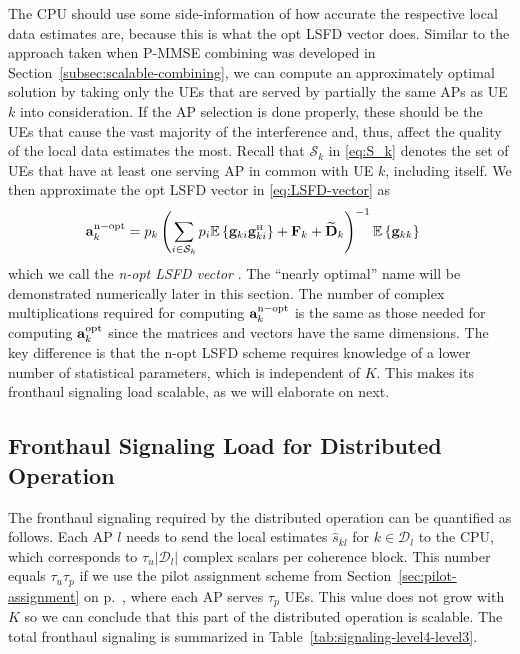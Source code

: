 The CPU should use some side-information of how accurate the respective local data estimates are, because this is what the opt LSFD vector does. Similar to the approach taken when P-MMSE combining was developed in Section~\ref{subsec:scalable-combining}, we can compute an approximately optimal solution by taking only the UEs that are served by partially the same APs as UE $k$ into consideration. If the AP selection is done properly, these should be the UEs that cause the vast majority of the interference and, thus, affect the quality of the local data estimates the most. Recall that $\mathcal{S}_k$ in \eqref{eq:S_k} denotes the set of UEs that have at least one serving AP in common with UE $k$, including itself. We then approximate the opt LSFD vector in \eqref{eq:LSFD-vector} as
\begin{align} \label{eq:partial-LSFD-vector}
&{\vect{a}}_{k}^{\rm n-opt} = p_k  \left( \sum\limits_{i\in \mathcal{S}_k}
p_{i} \mathbb{E} \left\{ {\vect{g}}_{ki} {\vect{g}}_{ki}^{\Htran} \right\} +   {\vect{F}}_{k} + \widetilde{\vect{D}}_k  \right)^{-1} \mathbb{E}\left\{ {\vect{g}}_{kk}\right\}
\end{align}
which we call the \emph{\gls{n-opt} LSFD vector} \cite{globecom_nopt}. The ``nearly optimal''  name will be demonstrated numerically later in this section.
The number of complex multiplications required for computing ${\mathbf{a}}_{k}^{\rm n-opt}$ is the same as those needed for computing ${\mathbf{a}}_{k}^{\rm opt}$ since the matrices and vectors have the same dimensions. The key difference is that the n-opt LSFD scheme requires knowledge of a lower number of statistical parameters, which is independent of $K$. This makes its fronthaul signaling load scalable, as we will elaborate on next.

\subsection{Fronthaul Signaling Load for Distributed Operation}
\label{sec:level3-fronthaul}


The fronthaul signaling required by the distributed operation can be quantified as follows. Each AP $l$ needs to send the local estimates $ \widehat{s}_{kl}$ for $k \in \mathcal{D}_l$ to the CPU, which corresponds to $\tau_u|\mathcal{D}_l|$ complex scalars per coherence block. This number equals $\tau_u \tau_p$ if we use the pilot assignment scheme from Section~\ref{sec:pilot-assignment} on p.~\pageref{sec:pilot-assignment}, where each AP serves $\tau_p$ UEs. This value does not grow with $K$ so we can conclude that this part of the distributed operation is scalable. The total fronthaul signaling is summarized in Table~\ref{tab:signaling-level4-level3}. 


